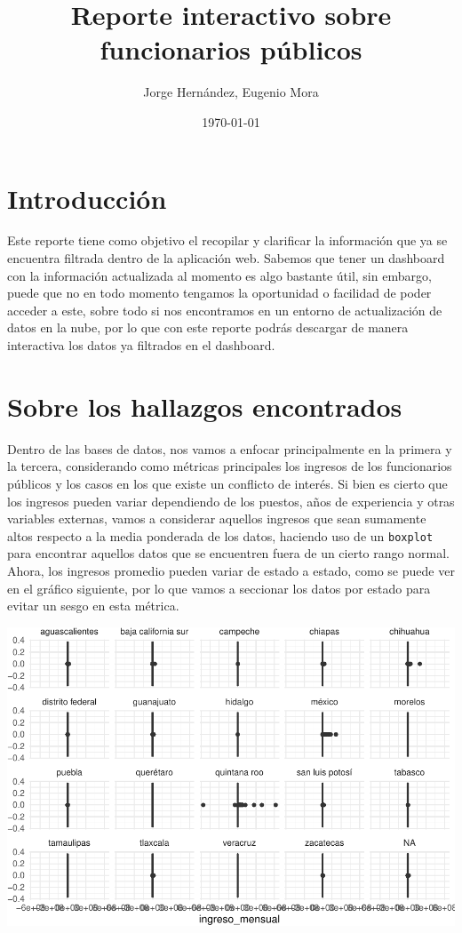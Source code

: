 \documentclass[10,a4paperpaper,]{article}
\title{Reporte interactivo sobre funcionarios públicos}
\author{Jorge Hernández, Eugenio Mora}
\date{\today}
\begin{document}
\renewcommand{\contentsname}{Tabla de contenidos}

\renewcommand{\pagename}{Página}


\maketitle
\tableofcontents
{}
\clearpage

\section{Introducción}

Este reporte tiene como objetivo el recopilar y clarificar la
información que ya se encuentra filtrada dentro de la aplicación web.
Sabemos que tener un dashboard con la información actualizada al momento
es algo bastante útil, sin embargo, puede que no en todo momento
tengamos la oportunidad o facilidad de poder acceder a este, sobre todo
si nos encontramos en un entorno de actualización de datos en la nube,
por lo que con este reporte podrás descargar de manera interactiva los
datos ya filtrados en el dashboard.

\section{Sobre los hallazgos encontrados}

Dentro de las bases de datos, nos vamos a enfocar principalmente en la
primera y la tercera, considerando como métricas principales los
ingresos de los funcionarios públicos y los casos en los que existe un
conflicto de interés. Si bien es cierto que los ingresos pueden variar
dependiendo de los puestos, años de experiencia y otras variables
externas, vamos a considerar aquellos ingresos que sean sumamente altos
respecto a la media ponderada de los datos, haciendo uso de un
\texttt{boxplot} para encontrar aquellos datos que se encuentren fuera
de un cierto rango normal. Ahora, los ingresos promedio pueden variar de
estado a estado, como se puede ver en el gráfico siguiente, por lo que
vamos a seccionar los datos por estado para evitar un sesgo en esta
métrica.

\includegraphics{report_files/figure-latex/unnamed-chunk-2-1.pdf}
\end{document}

